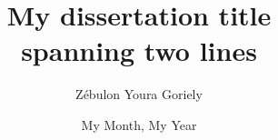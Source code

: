 
\title{My dissertation title\\
spanning two lines}

\author{Z\'ebulon Youra Goriely}



\submissiondate{\today}


\date{My Month, My Year}


